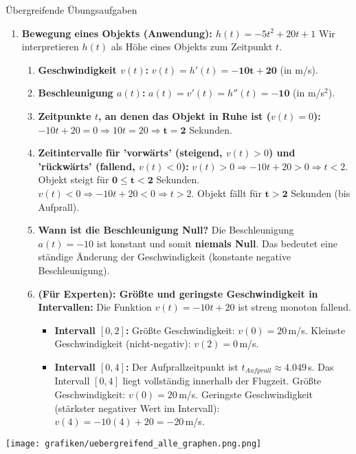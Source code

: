\begin{loesungsumgebung}{Übergreifende Übungsaufgaben}
\begin{enumerate}
    \item \textbf{Bewegung eines Objekts (Anwendung): $h(t) = -5t^2 + 20t + 1$}
    Wir interpretieren $h(t)$ als Höhe eines Objekts zum Zeitpunkt $t$.
    \begin{enumerate}[label=(\roman*)]
        \item \textbf{Geschwindigkeit $v(t)$:} $v(t) = h'(t) = \mathbf{-10t + 20}$ (in m/s).
        \item \textbf{Beschleunigung $a(t)$:} $a(t) = v'(t) = h''(t) = \mathbf{-10}$ (in m/s$^2$).
        \item \textbf{Zeitpunkte $t$, an denen das Objekt in Ruhe ist ($v(t)=0$):}
        $-10t + 20 = 0 \Rightarrow 10t = 20 \Rightarrow \mathbf{t=2}$ Sekunden.
        \item \textbf{Zeitintervalle für 'vorwärts' (steigend, $v(t)>0$) und 'rückwärts' (fallend, $v(t)<0$):}
        $v(t) > 0 \Rightarrow -10t + 20 > 0 \Rightarrow t < 2$. Objekt steigt für $\mathbf{0 \le t < 2}$ Sekunden.
        $v(t) < 0 \Rightarrow -10t + 20 < 0 \Rightarrow t > 2$. Objekt fällt für $\mathbf{t > 2}$ Sekunden (bis Aufprall).
        \item \textbf{Wann ist die Beschleunigung Null?} Die Beschleunigung $a(t) = -10$ ist konstant und somit \textbf{niemals Null}. Das bedeutet eine ständige Änderung der Geschwindigkeit (konstante negative Beschleunigung).
        \item \textbf{(Für Experten): Größte und geringste Geschwindigkeit in Intervallen:}
        Die Funktion $v(t) = -10t+20$ ist streng monoton fallend.
        \begin{itemize}
            \item \textbf{Intervall $[0, 2]$:}
            Größte Geschwindigkeit: $v(0) = 20\,$m/s. Kleinste Geschwindigkeit (nicht-negativ): $v(2) = 0\,$m/s.
            \item \textbf{Intervall $[0, 4]$:} Der Aufprallzeitpunkt ist $t_{Aufprall} \approx 4.049\,$s. Das Intervall $[0,4]$ liegt vollständig innerhalb der Flugzeit.
            Größte Geschwindigkeit: $v(0)=20\,$m/s.
            Geringste Geschwindigkeit (stärkster negativer Wert im Intervall): $v(4) = -10(4)+20 = -20\,$m/s.
        \end{itemize}
    \end{enumerate}
\end{enumerate}

\begin{center}
    \texttt{[image: grafiken/uebergreifend\_alle\_graphen.png.png]}
    \label{fig:uebergreifend_alle_graphen}
\end{center}

\end{loesungsumgebung}




